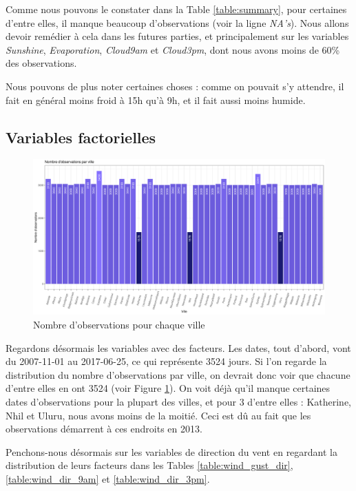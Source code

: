 \documentclass{article}
\begin{document}
Comme nous pouvons le constater dans la Table \ref{table:summary}, pour certaines d'entre elles, il manque beaucoup d'observations (voir la ligne \emph{NA's}). Nous allons devoir remédier à cela dans les futures parties, et principalement sur les variables \emph{Sunshine}, \emph{Evaporation}, \emph{Cloud9am} et \emph{Cloud3pm}, dont nous avons moins de 60\% des observations.

Nous pouvons de plus noter certaines choses : comme on pouvait s'y attendre, il fait en général moins froid à 15h qu'à 9h, et il fait aussi moins humide. 

\subsection{Variables factorielles}

\begin{figure}[H]
    \centering
    \includegraphics[width=\textwidth]{Images/hist_observations_cities.pdf}
    \caption{Nombre d'observations pour chaque ville}
    \label{fig:obs_per_cities}
\end{figure}

Regardons désormais les variables avec des facteurs. Les dates, tout d'abord, vont du 2007-11-01 au 2017-06-25, ce qui représente 3524 jours. Si l'on regarde la distribution du nombre d'observations par ville, on devrait donc voir que chacune d'entre elles en ont 3524 (voir Figure \ref{fig:obs_per_cities}). On voit déjà qu'il manque certaines dates d'observations pour la plupart des villes, et pour 3 d'entre elles : Katherine, Nhil et Uluru, nous avons moins de la moitié. Ceci est dû au fait que les observations démarrent à ces endroits en 2013.

Penchons-nous désormais sur les variables de direction du vent en regardant la distribution de leurs facteurs dans les Tables \ref{table:wind_gust_dir}, \ref{table:wind_dir_9am} et \ref{table:wind_dir_3pm}.
\end{document}
